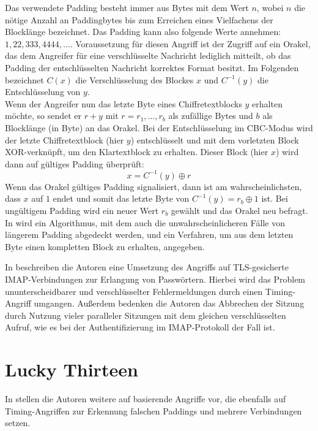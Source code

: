 Das verwendete Padding besteht immer aus Bytes mit dem Wert \(n\), wobei \(n\) die nötige Anzahl an Paddingbytes bis zum Erreichen eines Vielfachens der Blocklänge bezeichnet. Das Padding kann also folgende Werte annehmen: \(1, 22, 333, 4444, \dots\). Voraussetzung für diesen Angriff ist der Zugriff auf ein Orakel, das dem Angreifer für eine verschlüsselte Nachricht lediglich mitteilt, ob das Padding der entschlüsselten Nachricht korrektes Format besitzt. Im Folgenden bezeichnet \(C(x)\) die Verschlüsselung des Blockes \(x\) und \(C^{-1}(y)\) die Entschlüsselung von \(y\).\\
Wenn der Angreifer nun das letzte Byte eines Chiffretextblocks \(y\) erhalten möchte, so sendet er \(r + y\) mit \(r = r_1,  \dots , r_b\) als zufällige Bytes und \(b\) als Blocklänge (in Byte) an das Orakel. Bei der Entschlüsselung im CBC-Modus wird der letzte Chiffretextblock (hier \(y\)) entschlüsselt und mit dem vorletzten Block XOR-verknüpft, um den Klartextblock zu erhalten. Dieser Block (hier \(x\)) wird dann auf gültiges Padding überprüft:
\[x=C^{-1}(y) \oplus r\]
Wenn das Orakel gültiges Padding signalisiert, dann ist am wahrscheinlichsten, dass \(x\) auf \(1\) endet und somit das letzte Byte von \(C^{-1}(y)= r_b \oplus 1\) ist. Bei ungültigem Padding wird ein neuer Wert \(r_b\) gewählt und das Orakel neu befragt.\\
In \cite{vaudenay02} wird ein Algorithmus, mit dem auch die unwahrscheinlicheren Fälle von längerem Padding abgedeckt werden, und ein Verfahren, um aus dem letzten Byte einen kompletten Block zu erhalten, angegeben. 

In \cite{canvel03} beschreiben die Autoren eine Umsetzung des Angriffs auf TLS-gesicherte IMAP-Verbindungen zur Erlangung von Passwörtern. Hierbei wird das Problem ununterscheidbarer und verschlüsselter Fehlermeldungen durch einen Timing-Angriff umgangen. Außerdem bedenken die Autoren das Abbrechen der Sitzung durch Nutzung vieler paralleler Sitzungen mit dem gleichen verschlüsselten Aufruf, wie es bei der Authentifizierung im IMAP-Protokoll der Fall ist.


\section{Lucky Thirteen}

In \cite{paterson13} stellen die Autoren weitere auf \cite{vaudenay02} basierende Angriffe vor, die ebenfalls auf Timing-Angriffen zur Erkennung falschen Paddings und mehrere Verbindungen setzen.

